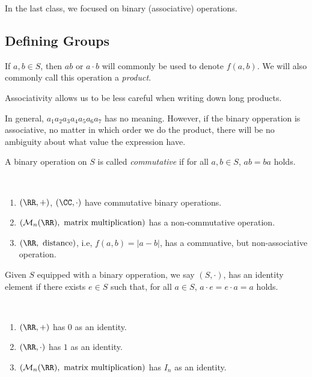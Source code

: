 
In the last class, we focused on binary (associative) operations.

\subsection{Defining Groups}

\begin{defn}[Notation]
	If $a, b \in S$, then $ab$ or $a \cdot b$ will commonly be used to denote $f(a,b)$. We will also commonly call this operation a \emph{product}.
\end{defn}

Associativity allows us to be less careful when writing down long products.

\begin{exmp}
	In general, $a_1a_2a_3a_4a_5a_6a_7$ has no meaning. However, if the binary opperation is associative, no matter in which order we do the product, there will be no ambiguity about what value the expression have.
\end{exmp}

\begin{defn}
	A binary operation on $S$ is called \emph{commutative} if for all $a, b \in S$, $ab = ba$ holds.
\end{defn}

\begin{exmp}~
	\begin{enumerate}
		\item $(\RR, +)$,  $(\CC, \cdot)$ have commutative binary operations.
		\item $(\mathcal{M}_n(\RR), \text{ matrix multiplication})$ has a non-commutative operation.
		\item $(\RR, \text{ distance})$, i.e, $f(a, b) = |a-b|$, has a commuative, but non-associative operation.
	\end{enumerate}
\end{exmp}

\begin{defn}
	Given $S$ equipped with a binary opperation, we say $(S, \cdot)$, has an identity element if there exists  $e \in S$ such that, for all $a \in S$, $a \cdot e = e \cdot a = a$ holds.
\end{defn}

\begin{exmp}~
	\begin{enumerate}
		\item $(\RR, +)$ has  $0$ as an identity.
		\item $(\RR, \cdot)$ has  $1$ as an identity.
		\item $(\mathcal{M}_n(\RR),\ \text{matrix multiplication})$ has $I_n$ as an identity.
	\end{enumerate}
\end{exmp}

